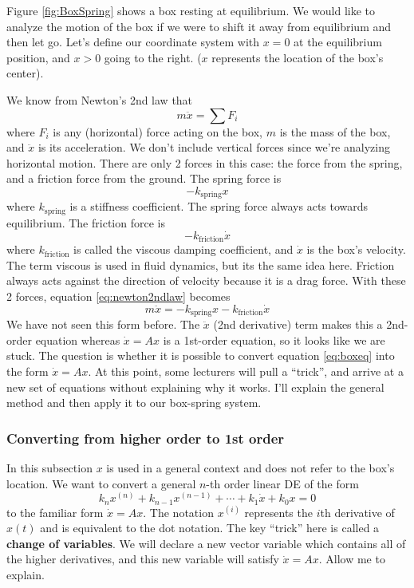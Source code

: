 \documentclass[11pt, oneside]{article}   	%
\begin{document}
Figure \ref{fig:BoxSpring} shows a box resting at equilibrium.
We would like to analyze the motion of the box if we were to shift it away from equilibrium and then let go.
Let's define our coordinate system with $x = 0$ at the equilibrium position, and $x > 0$ going to the right.
($x$ represents the location of the box's center).

We know from Newton's 2nd law that
\begin{equation} \label{eq:newton2ndlaw}
m \ddot{x} = \sum F_i
\end{equation}
where $F_i$ is any (horizontal) force acting on the box, $m$ is the mass of the box, and $\ddot{x}$ is its acceleration.
We don't include vertical forces since we're analyzing horizontal motion.
There are only 2 forces in this case: the force from the spring, and a friction force from the ground.
The spring force is
\begin{equation}
-k_\mathrm{spring} x
\end{equation}
where $k_\mathrm{spring}$ is a stiffness coefficient.
The spring force always acts towards equilibrium.
The friction force is
\begin{equation}
-k_\mathrm{friction} \dot{x}
\end{equation}
where $k_\mathrm{friction}$ is called the viscous damping coefficient, and $\dot{x}$ is the box's velocity.
The term viscous is used in fluid dynamics, but its the same idea here.
Friction always acts against the direction of velocity because it is a drag force.
With these 2 forces, equation \ref*{eq:newton2ndlaw} becomes
\begin{equation} \label{eq:boxeq}
m \ddot{x} =
-k_\mathrm{spring} x
-k_\mathrm{friction} \dot{x}
\end{equation}
We have not seen this form before.
The $\ddot{x}$ (2nd derivative) term makes this a 2nd-order equation whereas $\dot{x} = Ax$ is a 1st-order equation, so it looks like we are stuck.
The question is whether it is possible to convert equation \ref*{eq:boxeq} into the form $\dot{x} = Ax$.
At this point, some lecturers will pull a ``trick'', and arrive at a new set of equations without explaining why it works.
I'll explain the general method and then apply it to our box-spring system.

\subsubsection*{Converting from higher order to 1st order}

In this subsection $x$ is used in a general context and does not refer to the box's location.
We want to convert a general $n$-th order linear DE of the form
\begin{equation} \label{eq:nthOrderDE}
k_n x^{(n)}
+ k_{n-1} x^{(n-1)}
+ \cdots
+ k_{1} \dot{x}
+ k_{0} x
= 0
\end{equation}
to the familiar form $\dot{x} = Ax$.
The notation $x^{(i)}$ represents the $i$th derivative of $x(t)$ and is equivalent to the dot notation.
The key ``trick'' here is called a \textbf{change of variables}.
We will declare a new vector variable which contains all of the higher derivatives,
and this new variable will satisfy $\dot{x} = Ax$.
Allow me to explain.
\end{document}
